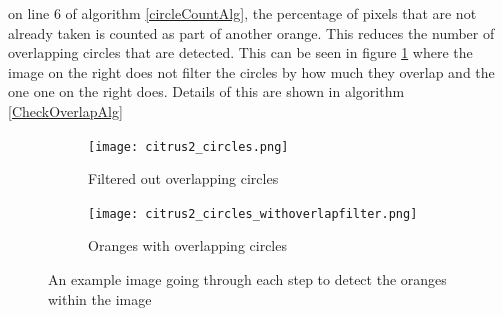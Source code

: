 \documentclass[conference]{IEEEtran}
\begin{document}
on line 6 of algorithm \ref{circleCountAlg}, the percentage of pixels that are not already taken is counted as part of another orange. This reduces the number of overlapping circles that are detected. This can be seen in figure \ref{overlapComp} where the image on the right does not filter the circles by how much they overlap and the one one on the right does. Details of this are shown in algorithm \ref{CheckOverlapAlg}




\begin{figure}
  \begin{subfigure}{.49\linewidth}
 	 \texttt{[image: citrus2\_circles.png]}\hfill
	 \caption{Filtered out overlapping circles}
  \end{subfigure}
  \begin{subfigure}{.49\linewidth}
  	\texttt{[image: citrus2\_circles\_withoverlapfilter.png]}
   	\caption{Oranges with overlapping circles}
  \end{subfigure}
  \caption{An example image going through each step to detect the oranges within the image} \label{overlapComp}
\end{figure}











\vspace{12pt}
\end{document}
